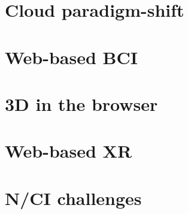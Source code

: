 \section{Cloud paradigm-shift}
\label{chapter2-cloud-paradigm-shift}


\section{Web-based BCI}
\label{chapter2-web-based-bci}


\section{3D in the browser}
\label{chapter2-3d-in-the-browser}


\section{Web-based XR}
\label{chapter2-web-based-xr}


\section{N/CI challenges}
\label{chapter2-nci-challenges}


